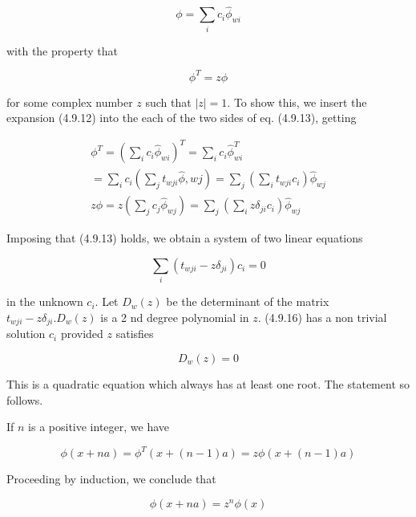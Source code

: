 \documentclass{article}
\begin{document}
\begin{equation*}
\phi=\sum_{i} c_{i} \hat{\phi}_{w i} \tag{4.9.12}
\end{equation*}
 
with the property that
 
\begin{equation*}
\phi^{T}=z \phi \tag{4.9.13}
\end{equation*}
 
for some complex number $z$ such that $|z|=1$. To show this, we insert the expansion (4.9.12) into the each of the two sides of eq. (4.9.13), getting
 
\begin{gather*}
\phi^{T}=\left(\sum_{i} c_{i} \hat{\phi}_{w i}\right)^{T}=\sum_{i} c_{i} \hat{\phi}_{w i}^{T}  \tag{4.9.14}\\
=\sum_{i} c_{i}\left(\sum_{j} t_{w j i} \hat{\phi}, w j\right)=\sum_{j}\left(\sum_{i} t_{w j i} c_{i}\right) \hat{\phi}_{w j} \\
z \phi=z\left(\sum_{j} c_{j} \hat{\phi}_{w j}\right)=\sum_{j}\left(\sum_{i} z \delta_{j i} c_{i}\right) \hat{\phi}_{w j} \tag{4.9.15}
\end{gather*}
 

Imposing that (4.9.13) holds, we obtain a system of two linear equations
 
\begin{equation*}
\sum_{i}\left(t_{w j i}-z \delta_{j i}\right) c_{i}=0 \tag{4.9.16}
\end{equation*}
 
in the unknown $c_{i}$. Let $D_{w}(z)$ be the determinant of the matrix $t_{w j i}-z \delta_{j i} . D_{w}(z)$ is a 2 nd degree polynomial in $z$. (4.9.16) has a non trivial solution $c_{i}$ provided $z$ satisfies
 
\begin{equation*}
D_{w}(z)=0 \tag{4.9.17}
\end{equation*}
 

This is a quadratic equation which always has at least one root. The statement so follows.

If $n$ is a positive integer, we have
 
\begin{equation*}
\phi(x+n a)=\phi^{T}(x+(n-1) a)=z \phi(x+(n-1) a) \tag{4.9.18}
\end{equation*}
 

Proceeding by induction, we conclude that
 
\begin{equation*}
\phi(x+n a)=z^{n} \phi(x) \tag{4.9.19}
\end{equation*}
 
\end{document}

